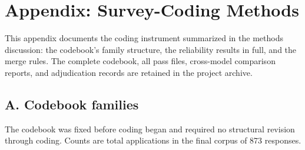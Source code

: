 
\section*{Appendix: Survey-Coding Methods}

This appendix documents the coding instrument summarized in the methods
discussion: the codebook's family structure, the reliability results in full,
and the merge rules. The complete codebook, all pass files, cross-model
comparison reports, and adjudication records are retained in the project
archive.

\subsection*{A. Codebook families}

The codebook was fixed before coding began and required no structural revision
through coding. Counts are total applications in the final corpus of 873
responses.

